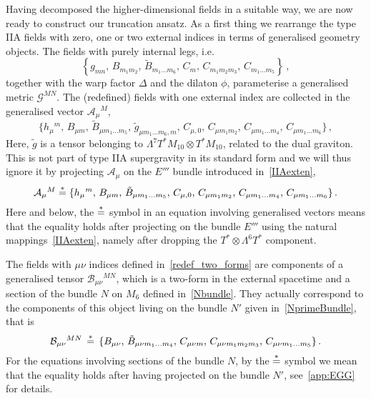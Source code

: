 \documentclass[debug]{phd}
\begin{document}
			Having decomposed the higher-dimensional fields in a suitable way, we are now ready to construct our truncation ansatz. 
			As a first thing we rearrange the type IIA fields with zero, one or two external indices in terms of generalised geometry objects. The fields with purely internal legs, i.e. 
					\begin{equation}
						\left\{g_{mn},\, B_{m_1m_2},\, \tilde B_{m_1\ldots m_6} ,\, C_m,\, C_{m_1m_2m_3},\, C_{m_1 \ldots m_5} \right\} \, ,
					\end{equation}
			together with the warp factor $\Delta$ and the dilaton $\phi$, parameterise a generalised metric $\mathcal{G}^{MN}$.
			The (redefined) fields with one external index are collected in the generalised vector $\mathcal{A}_\mu{}^M$,
					\begin{equation}\label{def_calA_mu^M}
						 \{ h_\mu{}^m ,\, B_{\mu m} ,\, \tilde B_{\mu m_1\ldots m_5},\, \tilde{g}_{\mu m_1\ldots m_6,m} ,\, C_{\mu,0},\, C_{\mu m_1m_2},\, C_{\mu m_1\ldots m_4},\, C_{\mu m_1\ldots m_6} \} \, ,
					\end{equation}
			Here, $\tilde{g}$ is a tensor belonging to $ \Lambda^7T^*M_{10}\otimes T^*M_{10}$, related to the dual graviton. 
			This is not part of type IIA supergravity in its standard form and we will thus ignore it by projecting $\mathcal{A}_\mu$ on the $E'''$ bundle introduced in~\eqref{IIAexten},
					\begin{equation}
						\mathcal{A}_\mu{}^M \stackrel{*}{=} \{ h_\mu{}^m ,\, B_{\mu m} ,\, \tilde B_{\mu m_1\ldots m_5},\, C_{\mu,0},\, C_{\mu m_1m_2},\, C_{\mu m_1\ldots m_4},\, C_{\mu m_1\ldots m_6} \} \, .
					\end{equation}
			Here and below, the $\stackrel{*}{=}$ symbol in an equation involving generalised vectors means that the equality holds after projecting on the bundle $E'''$ using the natural mappings~\eqref{IIAexten}, namely after dropping the $T^*\otimes \Lambda^{6}T^*$ component.

			The fields with $\mu\nu$ indices defined in~\eqref{redef_two_forms} are components of a generalised tensor $\mathcal{B}_{\mu\nu}{}^{MN}$, which is a two-form in the external spacetime and a section of the bundle $N$ on $M_6$ defined in~\eqref{Nbundle}. 
			They actually correspond to the components of this object living on the bundle $N'$ given in~\eqref{NprimeBundle}, that is
					\begin{equation}
						\mathcal{B}_{\mu\nu}{}^{MN} \,\stackrel{*}{=}\, \{ B_{\mu\nu},\, \tilde{B}_{\mu\nu m_1\ldots m_4} ,\, C_{\mu\nu m},\, C_{\mu\nu m_1m_2m_3} ,\, C_{\mu\nu m_1\ldots m_5}\}\,.
					\end{equation}
			For the equations involving sections of the bundle $N$, by the $\stackrel{*}{=}$ symbol we mean that the equality holds after having projected on the bundle $N'$, see~\cref{app:EGG} for details.
\end{document}
